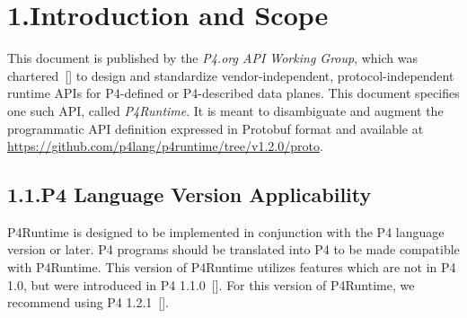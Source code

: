 \documentclass[11pt]{article}
\begin{document}
{\begin{mdtoc}
\begin{mdtocblock}

\end{mdtocblock}%
\end{mdtoc}%

\section{1.\hspace*{0.5em}Introduction and Scope}\label{sec-introduction-and-scope}%

\noindent{}This document is published by the \emph{P4.org API Working Group}, which was
chartered~[] to design and standardize vendor-independent,
protocol-independent runtime APIs for P4-defined or P4-described data
planes. This document specifies one such API, called \emph{P4Runtime}. It is meant to
disambiguate and augment the programmatic API definition expressed in Protobuf
format and available at
\href{https://github.com/p4lang/p4runtime/tree/v1.2.0/proto}{https://github.com/p4lang/p4runtime/tree/v1.2.0/proto}.%

\subsection{1.1.\hspace*{0.5em}P4 Language Version Applicability}\label{sec-p4-language-version-applicability}%

\noindent{}P4Runtime is designed to be implemented in conjunction with the P4 language
version or later. P4 programs should be translated into P4 to be made
compatible with P4Runtime. This version of P4Runtime utilizes features which are
not in P4 1.0, but were introduced in P4 1.1.0~[]. For
this version of P4Runtime, we recommend using P4 1.2.1~[].%

}
\end{document}
